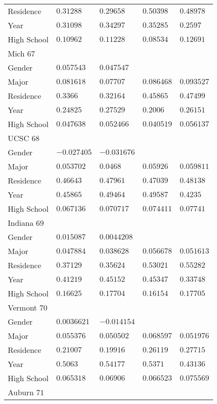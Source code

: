 \begin{center}
\begin{longtable}{|l|l|l|l|l|}
Residence & $0.31288$ & $0.29658$ & $0.50398$ & $0.48978$ \\
Year & $0.31098$ & $0.34297$ & $0.35285$ & $0.2597$ \\
High School & $0.10962$ & $0.11228$ & $0.08534$ & $0.12691$ \\ \hline \hline
Mich $67$ & & &   \\ \hline
Gender & $0.057543$ & $0.047547$ & & \\
Major & $0.081618$ & $0.07707$ & $0.086468$ & $0.093527$ \\
Residence & $0.3366$ & $0.32164$ & $0.45865$ & $0.47499$ \\
Year & $0.24825$ & $0.27529$ & $0.2006$ & $0.26151$ \\
High School & $0.047638$ & $0.052466$ & $0.040519$ & $0.056137$ \\ \hline \hline
UCSC $68$ & & &   \\ \hline
Gender & $-0.027405$ & $-0.031676$ & & \\
Major & $0.053702$ & $0.0468$ & $0.05926$ & $0.059811$ \\
Residence & $0.46643$ & $0.47961$ & $0.47039$ & $0.48138$ \\
Year & $0.45865$ & $0.49464$ & $0.49587$ & $0.4235$ \\
High School & $0.067136$ & $0.070717$ & $0.074411$ & $0.07741$ \\ \hline \hline
Indiana $69$ & & &   \\ \hline
Gender & $0.015087$ & $0.0044208$ & & \\
Major & $0.047884$ & $0.038628$ & $0.056678$ & $0.051613$ \\
Residence & $0.37129$ & $0.35624$ & $0.53021$ & $0.55282$ \\
Year & $0.41219$ & $0.45152$ & $0.45347$ & $0.33748$ \\
High School & $0.16625$ & $0.17704$ & $0.16154$ & $0.17705$ \\ \hline \hline
Vermont $70$ & & &   \\ \hline
Gender & $0.0036621$ & $-0.014154$ & & \\
Major & $0.055376$ & $0.050502$ & $0.068597$ & $0.051976$ \\
Residence & $0.21007$ & $0.19916$ & $0.26119$ & $0.27715$ \\
Year & $0.5063$ & $0.54177$ & $0.5371$ & $0.43136$ \\
High School & $0.065318$ & $0.06906$ & $0.066523$ & $0.075569$ \\ \hline \hline
Auburn $71$ & & &   \\ \hline

\end{longtable}
\end{center}
